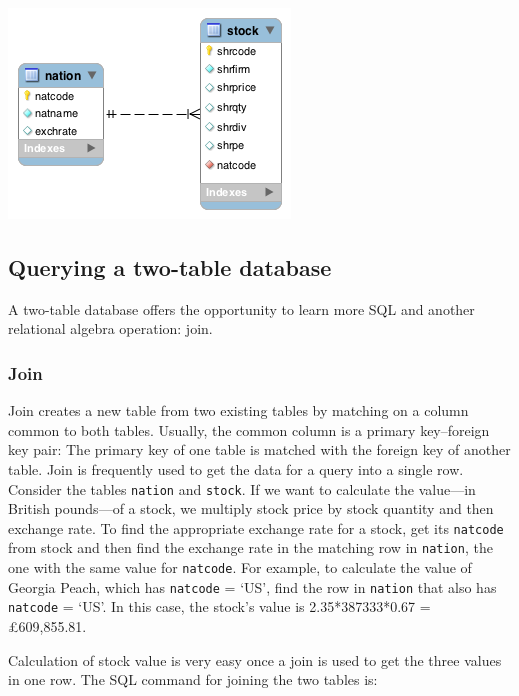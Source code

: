 \documentclass[
]{article}
\begin{document}
\includegraphics{Figures/Chapter 4/wb-stock-nation.png}

\hypertarget{querying-a-two-table-database}{%
\subsection*{Querying a two-table database}\label{querying-a-two-table-database}}

A two-table database offers the opportunity to learn more SQL and
another relational algebra operation: join.

\hypertarget{join}{%
\subsubsection*{Join}\label{join}}

Join creates a new table from two existing tables by matching on a
column common to both tables. Usually, the common column is a primary
key--foreign key pair: The primary key of one table is matched with the
foreign key of another table. Join is frequently used to get the data
for a query into a single row. Consider the tables \texttt{nation} and \texttt{stock}.
If we want to calculate the value---in British pounds---of a stock, we
multiply stock price by stock quantity and then exchange rate. To find
the appropriate exchange rate for a stock, get its \texttt{natcode} from stock
and then find the exchange rate in the matching row in \texttt{nation}, the one
with the same value for \texttt{natcode}. For example, to calculate the value
of Georgia Peach, which has \texttt{natcode} = `US', find the row in \texttt{nation}
that also has \texttt{natcode} = `US'. In this case, the stock's value is
2.35*387333*0.67 = £609,855.81.

Calculation of stock value is very easy once a join is used to get the
three values in one row. The SQL command for joining the two tables is:
\end{document}
